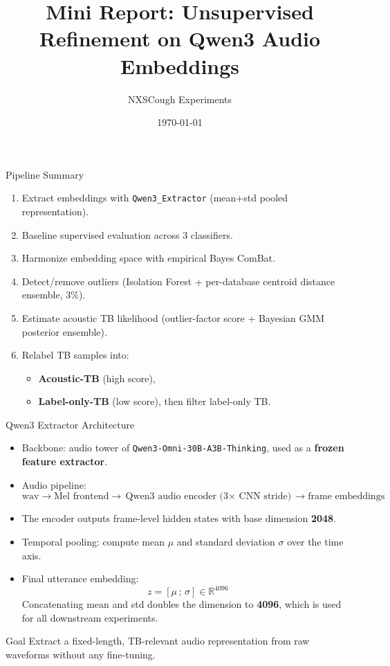 \documentclass[aspectratio=169]{beamer}
\title{Mini Report: Unsupervised Refinement on Qwen3 Audio Embeddings}
\author{NXSCough Experiments}
\date{\today}
\begin{document}
\begin{frame}
  \titlepage
\end{frame}

\begin{frame}{Pipeline Summary}
\begin{enumerate}
  \item Extract embeddings with \texttt{Qwen3\_Extractor} (mean+std pooled representation).
  \item Baseline supervised evaluation across 3 classifiers.
  \item Harmonize embedding space with empirical Bayes ComBat.
  \item Detect/remove outliers (Isolation Forest + per-database centroid distance ensemble, 3\%).
  \item Estimate acoustic TB likelihood (outlier-factor score + Bayesian GMM posterior ensemble).
  \item Relabel TB samples into:
  \begin{itemize}
    \item \textbf{Acoustic-TB} (high score),
    \item \textbf{Label-only-TB} (low score), then filter label-only TB.
  \end{itemize}
\end{enumerate}
\end{frame}

\begin{frame}{Qwen3 Extractor Architecture}
\begin{itemize}
  \item Backbone: audio tower of \texttt{Qwen3-Omni-30B-A3B-Thinking}, used as a \textbf{frozen feature extractor}.
  \item Audio pipeline:
  \[
    \text{wav} \rightarrow \text{Mel frontend} \rightarrow \text{Qwen3 audio encoder (3$\times$ CNN stride)} \rightarrow \text{frame embeddings}
  \]
  \item The encoder outputs frame-level hidden states with base dimension \textbf{2048}.
  \item Temporal pooling: compute mean $\mu$ and standard deviation $\sigma$ over the time axis.
  \item Final utterance embedding:
  \[
    z = [\mu\,;\,\sigma] \in \mathbb{R}^{4096}
  \]
  Concatenating mean and std doubles the dimension to \textbf{4096}, which is used for all downstream experiments.
\end{itemize}
\begin{block}{Goal}
  Extract a fixed-length, TB-relevant audio representation from raw waveforms without any fine-tuning.
\end{block}
\end{frame}
\end{document}
